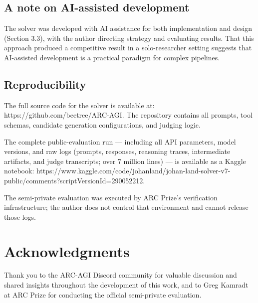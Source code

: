 \documentclass[11pt]{article}
\begin{document}
\hypertarget{a-note-on-ai-assisted-development}{%
\subsection{A note on AI-assisted
development}\label{a-note-on-ai-assisted-development}}

The solver was developed with AI assistance for both implementation and
design (Section 3.3), with the author directing strategy and evaluating
results. That this approach produced a competitive result in a
solo-researcher setting suggests that AI-assisted development is a
practical paradigm for complex pipelines.

\hypertarget{reproducibility}{%
\subsection{Reproducibility}\label{reproducibility}}

The full source code for the solver is available at:
https://github.com/beetree/ARC-AGI. The repository contains all prompts,
tool schemas, candidate generation configurations, and judging logic.

The complete public-evaluation run --- including all API parameters,
model versions, and raw logs (prompts, responses, reasoning traces,
intermediate artifacts, and judge transcripts; over 7 million lines) ---
is available as a Kaggle notebook:
https://www.kaggle.com/code/johanland/johan-land-solver-v7-public/comments?scriptVersionId=290052212.

The semi-private evaluation was executed by ARC Prize's verification
infrastructure; the author does not control that environment and cannot
release those logs.

\hypertarget{acknowledgments}{%
\section{Acknowledgments}\label{acknowledgments}}

Thank you to the ARC-AGI Discord community for valuable discussion and
shared insights throughout the development of this work, and to Greg
Kamradt at ARC Prize for conducting the official semi-private
evaluation.
\end{document}
